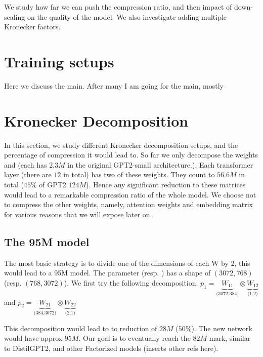 \documentclass{article}
\begin{document}
We study how far we can push the compression ratio, and then impact of down-scaling on the quality of the model. We also investigate adding multiple Kronecker factors.


\section{Training setups}%
\label{sec:Training setups}

Here we discuss the main. After many I am going for the main, mostly  




\section{Kronecker Decomposition}%
\label{sub:Kronecker Decomposition}

In this section, we study different Kronecker decomposition setups, and the percentage of compression it would  lead to. So far we only decompose the weights  and  (each has $2.3M$ in the original GPT2-small architecture.). Each transformer layer (there are $12$ in total) has two of these weights. They count to $56.6M$ in total ($45\%$ of GPT2 $124M$). Hence any significant reduction to these matrices would lead to a remarkable compression ratio of the whole model. We choose not to compress the other weights, namely, attention weights and embedding matrix for various reasons that we will expose later on. 

\subsection{The 95M model}%
\label{sub:The 95M model}
The most basic strategy is to divide one of the dimensions of each W by 2, this would lead to a 95M model. The parameter  (resp. ) has a shape of $(3072, 768)$ (resp.  $(768, 3072)$). We first try the following decomposition: $p_1 = \underbrace{W_{11}}_{\text{(3072,384)}} \otimes \underbrace{W_{12}}_{\text{(1,2)}}$  and $p_2 = \underbrace{W_{21}}_{\text{(384,3072)}} \otimes \underbrace{W_{22}}_{\text{(2,1)}}$  


This decomposition would lead to to reduction of $28M$ ($50\%$). The new network would have approx $95M$. Our goal is to eventually reach the $82M$ mark, similar to DistilGPT2, and other Factorized models (inserts other refs here).
\end{document}
